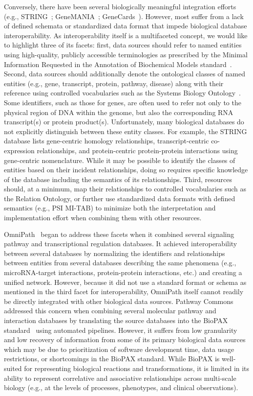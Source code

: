 Conversely, there have been several biologically meaningful integration efforts (e.g., STRING~\cite{Warde-Farley2010}; GeneMANIA~\cite{Szklarczyk2015}; GeneCards~\cite{Stelzer2016}).
However, most suffer from a lack of defined schemata or standardized data format that impede biological database interoperability.
As interoperability itself is a multifaceted concept, we would like to highlight three of its facets: first, data sources should refer to named entities using high-quality, publicly accessible terminologies as prescribed by the Minimal Information Requested in the Annotation of Biochemical Models standard~\cite{Laibe2007}.
Second, data sources should additionally denote the ontological classes of named entities (e.g., gene, transcript, protein, pathway, disease) along with their reference using controlled vocabularies such as the Systems Biology Ontology~\cite{Courtot2011}.
Some identifiers, such as those for genes, are often used to refer not only to the physical region of DNA within the genome, but also the corresponding RNA transcript(s) or protein product(s).
Unfortunately, many biological databases do not explicitly distinguish between these entity classes.
For example, the STRING database lists gene-centric homology relationships, transcript-centric co-expression relationships, and protein-centric protein-protein interactions using gene-centric nomenclature.
While it may be possible to identify the classes of entities based on their incident relationships, doing so requires specific knowledge of the database including the semantics of its relationships.
Third, resources should, at a minimum, map their relationships to controlled vocabularies such as the Relation Ontology, or further use standardized data formats with defined semantics (e.g., PSI MI-TAB) to minimize both the interpretation and implementation effort when combining them with other resources.

OmniPath~\cite{Turei2016} began to address these facets when it combined several signaling pathway and transcriptional regulation databases.
It achieved interoperability between several databases by normalizing the identifiers and relationships between entities from several databases describing the same phenomena (e.g., microRNA-target interactions, protein-protein interactions, etc.) and creating a unified network.
However, because it did not use a standard format or schema as mentioned in the third facet for interoperability, OmniPath itself cannot readily be directly integrated with other biological data sources.
Pathway Commons~\cite{Cerami2011} addressed this concern when combining several molecular pathway and interaction databases by translating the source databases into the BioPAX standard~\cite{Demir2010} using automated pipelines.
However, it suffers from low granularity and low recovery of information from some of its primary biological data sources which may be due to prioritization of software development time, data usage restrictions, or shortcomings in the BioPAX standard.
While BioPAX is well-suited for representing biological reactions and transformations, it is limited in its ability to represent correlative and associative relationships across multi-scale biology (e.g., at the levels of processes, phenotypes, and clinical observations).

